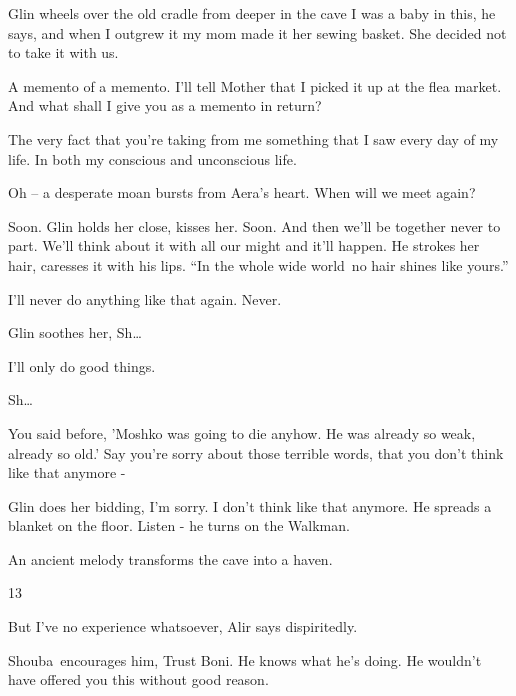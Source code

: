 \documentclass[letterpaper]{article}
\begin{document}
Glin wheels over the old cradle from deeper in the cave {\textquotedbl}I was a baby in this,{\textquotedbl} he says,
{\textquotedbl}and when I outgrew it my mom made it her sewing basket. She decided not to take it with
us.{\textquotedbl} 

{\textquotedbl}A memento of a memento. I'll tell Mother that I picked it up at the flea market. And what shall I give
you as a memento in return?{\textquotedbl}

{\textquotedbl}The very fact that you're taking from me something that I saw every day of my life. In both my conscious
and unconscious life.{\textquotedbl}

{\textquotedbl}Oh -- {\textquotedbl} a desperate moan bursts from Aera's heart. {\textquotedbl}When will we meet
again?{\textquotedbl} 

{\textquotedbl}Soon.{\textquotedbl} Glin holds her close, kisses her. {\textquotedbl}Soon. And then we'll be together
never to part. We'll think about it with all our might and it'll happen.{\textquotedbl} He strokes her hair, caresses
it with his lips. ``In the whole wide world~no hair shines like yours.''

{\textquotedbl}I'll never do anything like that again. Never.{\textquotedbl} 

Glin soothes her, {\textquotedbl}Sh{\dots}{\textquotedbl}~ 

{\textquotedbl}I'll only do good things.{\textquotedbl} 

{\textquotedbl}Sh{\dots}{\textquotedbl} 

{\textquotedbl}You said before, 'Moshko was going to die anyhow. He was already so weak, already so old.' Say you're
sorry about those terrible words, that you don't think like that anymore -{\textquotedbl} 

Glin does her bidding, {\textquotedbl}I'm sorry. I don't think like that anymore.{\textquotedbl} He spreads a blanket on
the floor. {\textquotedbl}Listen -{\textquotedbl} he turns on the Walkman.

An ancient melody transforms the cave into a haven.\ 


\bigskip

13

{\textquotedbl}But I've no experience whatsoever,{\textquotedbl} Alir says dispiritedly.

Shouba\ encourages him, {\textquotedbl}Trust Boni. He knows what he's doing. He wouldn't have offered you this without
good reason.{\textquotedbl} 
\end{document}
